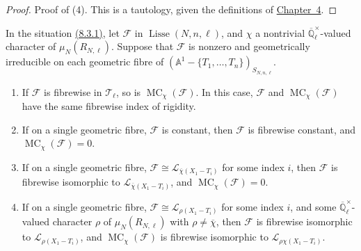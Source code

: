 \begin{proof}
Proof of (4). This is a tautology, given the definitions of \hyperref[chap:4]{Chapter~4}.
\end{proof}

In the situation \hyperref[par:8.3.1]{(8.3.1)}, let \(\mathcal{F}\) in \(\operatorname{Lisse}(N,n,\ell)\), and \(\chi\) a nontrivial \(\overline{\mathbb{Q}}_\ell^{\times}\)-valued character of \(\mu_N(R_{N,\ell})\). Suppose that \(\mathcal{F}\) is nonzero and geometrically irreducible on each geometric fibre of \((\mathbb{A}^1-\{T_1,\ldots,T_n\})_{S_{N,n,\ell}}\).
\begin{enumerate}[label=(\arabic*)]
\item If \(\mathcal{F}\) is fibrewise in \(\mathcal{T}_\ell\), so is \(\operatorname{MC}_\chi(\mathcal{F})\). In this case, \(\mathcal{F}\) and \(\operatorname{MC}_\chi(\mathcal{F})\) have the same fibrewise index of rigidity.
\item If on a single geometric fibre, \(\mathcal{F}\) is constant, then \(\mathcal{F}\) is fibrewise constant, and \(\operatorname{MC}_\chi(\mathcal{F})=0\).
\item If on a single geometric fibre, \(\mathcal{F}\cong\mathcal{L}_{\overline{\chi}(X_1-T_i)}\) for some index \(i\), then \(\mathcal{F}\) is fibrewise isomorphic to \(\mathcal{L}_{\overline{\chi}(X_1-T_i)}\), and \(\operatorname{MC}_\chi(\mathcal{F})=0\).
\item If on a single geometric fibre, \(\mathcal{F}\cong\mathcal{L}_{\rho(X_1-T_i)}\) for some index \(i\), and some \(\overline{\mathbb{Q}}_\ell^{\times}\)-valued character \(\rho\) of \(\mu_N(R_{N,\ell})\) with \(\rho\ne\overline{\chi}\), then \(\mathcal{F}\) is fibrewise isomorphic to \(\mathcal{L}_{\rho(X_1-T_i)}\), and \(\operatorname{MC}_\chi(\mathcal{F})\) is fibrewise isomorphic to \(\mathcal{L}_{\rho\chi(X_1-T_i)}\).
\end{enumerate}
